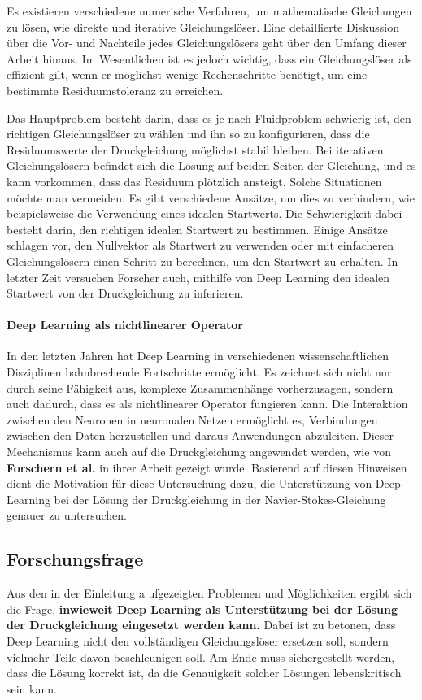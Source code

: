 Es existieren verschiedene numerische Verfahren, um mathematische Gleichungen zu lösen, wie direkte und iterative Gleichungslöser. Eine detaillierte Diskussion über die Vor- und Nachteile jedes Gleichungslösers geht über den Umfang dieser Arbeit hinaus. Im Wesentlichen ist es jedoch wichtig, dass ein Gleichungslöser als effizient gilt, wenn er möglichst wenige Rechenschritte benötigt, um eine bestimmte Residuumstoleranz zu erreichen.

Das Hauptproblem besteht darin, dass es je nach Fluidproblem schwierig ist, den richtigen Gleichungslöser zu wählen und ihn so zu konfigurieren, dass die Residuumswerte der Druckgleichung möglichst stabil bleiben. Bei iterativen Gleichungslösern befindet sich die Lösung auf beiden Seiten der Gleichung, und es kann vorkommen, dass das Residuum plötzlich ansteigt. Solche Situationen möchte man vermeiden. Es gibt verschiedene Ansätze, um dies zu verhindern, wie beispielsweise die Verwendung eines idealen Startwerts. Die Schwierigkeit dabei besteht darin, den richtigen idealen Startwert zu bestimmen. Einige Ansätze schlagen vor, den Nullvektor als Startwert zu verwenden oder mit einfacheren Gleichungslösern einen Schritt zu berechnen, um den Startwert zu erhalten. In letzter Zeit versuchen Forscher auch, mithilfe von Deep Learning den idealen Startwert von der Druckgleichung zu inferieren.

\paragraph{Deep Learning als nichtlinearer Operator}
In den letzten Jahren hat Deep Learning in verschiedenen wissenschaftlichen Disziplinen bahnbrechende Fortschritte ermöglicht. Es zeichnet sich nicht nur durch seine Fähigkeit aus, komplexe Zusammenhänge vorherzusagen, sondern auch dadurch, dass es als nichtlinearer Operator fungieren kann. Die Interaktion zwischen den Neuronen in neuronalen Netzen ermöglicht es, Verbindungen zwischen den Daten herzustellen und daraus Anwendungen abzuleiten. Dieser Mechanismus kann auch auf die Druckgleichung angewendet werden, wie von \textbf{Forschern et al.} in ihrer Arbeit gezeigt wurde. Basierend auf diesen Hinweisen dient die Motivation für diese Untersuchung dazu, die Unterstützung von Deep Learning bei der Lösung der Druckgleichung in der Navier-Stokes-Gleichung genauer zu untersuchen.

\subsection{Forschungsfrage}
Aus den in der Einleitung a
ufgezeigten Problemen und Möglichkeiten ergibt sich die Frage, \textbf{inwieweit Deep Learning als Unterstützung bei der Lösung der Druckgleichung eingesetzt werden kann.} Dabei ist zu betonen, dass Deep Learning nicht den vollständigen Gleichungslöser ersetzen soll, sondern vielmehr Teile davon beschleunigen soll. Am Ende muss sichergestellt werden, dass die Lösung korrekt ist, da die Genauigkeit solcher Lösungen lebenskritisch sein kann.


